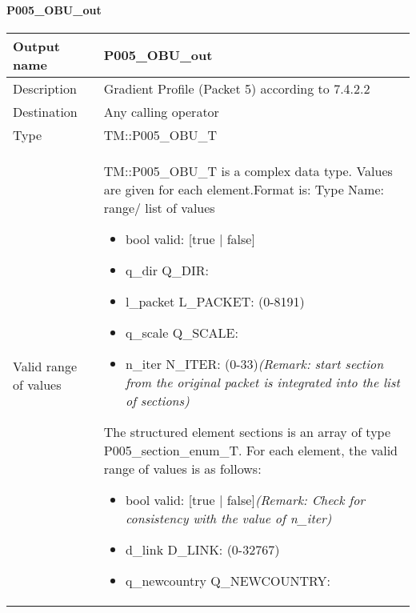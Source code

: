\paragraph{P005\_OBU\_out}

\begin{longtable}{p{}p{}}
\toprule
Output name				& P005\_OBU\_out \\
\midrule
Description				& Gradient Profile (Packet 5) according to 7.4.2.2 \\
\midrule
Destination				& Any calling operator\\ 
\midrule
Type					& TM::P005\_OBU\_T\\
\midrule
Valid range of values	& TM::P005\_OBU\_T is a complex data type. Values are given for each element.\newline Format is: Type Name: range/ list of values
\begin{itemize}
\item bool valid: [true | false]
\item q\_dir Q\_DIR:
\item l\_packet L\_PACKET: (0-8191)
\item q\_scale Q\_SCALE: 
\item n\_iter N\_ITER: (0-33)\newline \emph{(Remark: start section from the original packet is integrated into the list of sections)}
\end{itemize}
The structured element sections is an array of type P005\_section\_enum\_T. For each element, the valid range of values is as follows:
\begin{itemize}
\item bool valid: [true | false]\newline \emph{(Remark: Check for consistency with the value of n\_iter)}
\item d\_link D\_LINK: (0-32767)
\item q\_newcountry Q\_NEWCOUNTRY:

\end{itemize}
\end{longtable}
